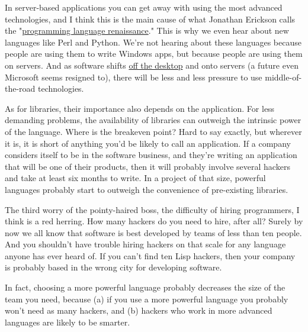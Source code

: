 In
                  server-based applications you can get away with using the most
                  advanced technologies, and I think this is the main cause of
                  what Jonathan Erickson calls the "\href{http://www.byte.com/documents/s=1821/byt20011214s0003/}{programming language renaissance}." This is why we even hear about new languages like Perl and
                  Python. We're not hearing about these languages because people
                  are using them to write Windows apps, but because people are
                  using them on servers. And as software shifts
                  \href{http://www.paulgraham.com/road.html}{off the desktop} and onto servers (a
                  future even Microsoft seems resigned to), there will be less
                  and less pressure to use middle-of-the-road technologies.

As
                  for libraries, their importance also depends on the
                  application. For less demanding problems, the availability of
                  libraries can outweigh the intrinsic power of the language.
                  Where is the breakeven point? Hard to say exactly, but
                  wherever it is, it is short of anything you'd be likely to
                  call an application. If a company considers itself to be in
                  the software business, and they're writing an application that
                  will be one of their products, then it will probably involve
                  several hackers and take at least six months to write. In a
                  project of that size, powerful languages probably start to
                  outweigh the convenience of pre-existing libraries.

The
                  third worry of the pointy-haired boss, the difficulty of
                  hiring programmers, I think is a red herring. How many hackers
                  do you need to hire, after all? Surely by now we all know that
                  software is best developed by teams of less than ten people.
                  And you shouldn't have trouble hiring hackers on that scale
                  for any language anyone has ever heard of. If you can't find
                  ten Lisp hackers, then your company is probably based in the
                  wrong city for developing software.

In fact,
                  choosing a more powerful language probably decreases the size
                  of the team you need, because (a) if you use a more powerful
                  language you probably won't need as many hackers, and (b)
                  hackers who work in more advanced languages are likely to be
                  smarter.

